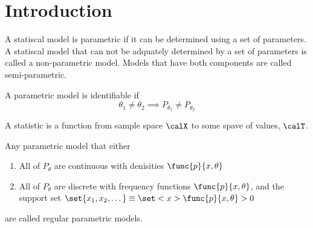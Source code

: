 \chapter{Introduction}
\begin{definition}
    A statiscal model is parametric if it can be determined using a set of parameters. A statiscal model that can not be adquately determined by a set of parameters is called a non-parametric model. Models that have both components are called semi-parametric. 
\end{definition}

\begin{definition}
    A parametric model is identifiable if 
    \begin{equation}
        \theta_1 \neq \theta_2 \implies P_{\theta_1} \neq P_{\theta_2}
    \end{equation}
\end{definition}

\begin{definition}
    A statistic is a function from sample space \(\calX\) to some spave of values, \(\calT\).
\end{definition}

\begin{definition}
    Any parametric model that either
    \begin{enumerate}
        \item All of \(P_{\theta}\) are continuous with denisities \(\func{p}{x,\theta}\)
        \item All of \(P_{\theta}\) are discrete with frequency functions \(\func{p}{x,\theta}\), and the support set \(\set{x_1, x_2, \dots} \equiv \set<x>{\func{p}{x,\theta} > 0}\)
    \end{enumerate}
    are called regular parametric models.
\end{definition}

